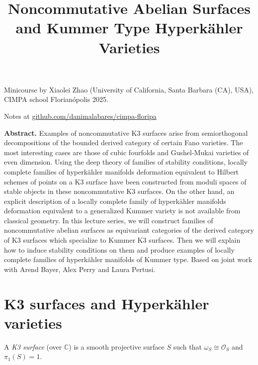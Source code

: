 


\title{Noncommutative Abelian Surfaces and Kummer Type Hyperkähler Varieties}
\maketitle

\noindent
Minicourse by Xiaolei Zhao (University of California, Santa Barbara (CA), USA), 
CIMPA school Florianópolis 2025.

\medskip\noindent
Notes at 
\href{http://github.com/danimalabares/cimpa-floripa}
{github.com/danimalabares/cimpa-floripa}

\bigskip\noindent

{\bf Abstract.} Examples of noncommutative K3 surfaces arise from semiorthogonal
decompositions of the bounded derived category of certain Fano varieties. The
most interesting cases are those of cubic fourfolds and Gushel-Mukai varieties
of even dimension. Using the deep theory of families of stability conditions,
locally complete families of hyperkähler manifolds deformation equivalent to
Hilbert schemes of points on a K3 surface have been constructed from moduli
spaces of stable objects in these noncommutative K3 surfaces. On the other hand,
an explicit description of a locally complete family of hyperkähler manifolds
deformation equivalent to a generalized Kummer variety is not available from
classical geometry. In this lecture series, we will construct families of
noncommutative abelian surfaces as equivariant categories of the derived
category of K3 surfaces which specialize to Kummer K3 surfaces. Then we will
explain how to induce stability conditions on them and produce examples of
locally complete families of hyperkähler manifolds of Kummer type. Based on
joint work with Arend Bayer, Alex Perry and Laura Pertusi. 

\bigskip\noindent
\tableofcontents
\bigskip\noindent

\noindent

\section{K3 surfaces and Hyperkähler varieties}
\label{section-K3-surfaces-and-hyperkahler-varieties}

\begin{definition}
\label{definition-K3-surface}
A {\it K3 surface} (over $\mathbb{C}$) is a smooth projective surface $S$ such
that $\omega_S \cong \mathcal{O}_S$ and $\pi_1(S)=1$.
\end{definition}

